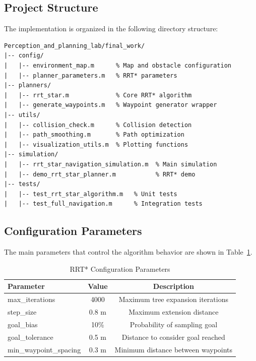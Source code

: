 \documentclass[12pt,a4paper]{scrartcl}
\begin{document}
	\subsection{Project Structure}
	
	The implementation is organized in the following directory structure:
	
	\begin{lstlisting}[style=matlabstyle,caption={Project Structure}]
Perception_and_planning_lab/final_work/
|-- config/
|   |-- environment_map.m      % Map and obstacle configuration
|   |-- planner_parameters.m   % RRT* parameters
|-- planners/
|   |-- rrt_star.m             % Core RRT* algorithm
|   |-- generate_waypoints.m   % Waypoint generator wrapper
|-- utils/
|   |-- collision_check.m      % Collision detection
|   |-- path_smoothing.m       % Path optimization
|   |-- visualization_utils.m  % Plotting functions
|-- simulation/
|   |-- rrt_star_navigation_simulation.m  % Main simulation
|   |-- demo_rrt_star_planner.m           % RRT* demo
|-- tests/
|   |-- test_rrt_star_algorithm.m   % Unit tests
|   |-- test_full_navigation.m      % Integration tests
	\end{lstlisting}
	
	\subsection{Configuration Parameters}
	
	The main parameters that control the algorithm behavior are shown in Table~\ref{tab:params}.
	
	\begin{table}[htb]
		\centering
		\caption{RRT* Configuration Parameters}
		\begin{tabular}{lcc}
			\toprule
			\textbf{Parameter} & \textbf{Value} & \textbf{Description} \\
			\midrule
			max\_iterations & 4000 & Maximum tree expansion iterations \\
			step\_size & 0.8 m & Maximum extension distance \\
			goal\_bias & 10\% & Probability of sampling goal \\
			goal\_tolerance & 0.5 m & Distance to consider goal reached \\
			min\_waypoint\_spacing & 0.3 m & Minimum distance between waypoints \\
			\bottomrule
		\end{tabular}
		\label{tab:params}
	\end{table}
	
\end{document}
